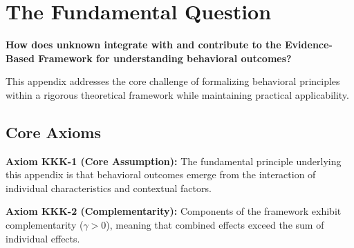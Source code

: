 

\section{The Fundamental Question}
\label{sec:kkk-fundamental}

\begin{tcolorbox}[
    colback=red!5!white,
    colframe=red!75!black,
    title={\textbf{Fundamental Question}}
]
\textbf{How does unknown integrate with and contribute to the
Evidence-Based Framework for understanding behavioral outcomes?}

This appendix addresses the core challenge of formalizing behavioral principles
within a rigorous theoretical framework while maintaining practical applicability.
\end{tcolorbox}




\subsection{Core Axioms}
\label{sec:kkk-axioms}

\begin{tcolorbox}[colback=yellow!5!white,colframe=yellow!75!black,title=Axiom KKK-1: Fundamental Principle]
\textbf{Axiom KKK-1 (Core Assumption):}
The fundamental principle underlying this appendix is that behavioral outcomes
emerge from the interaction of individual characteristics and contextual factors.
\end{tcolorbox}

\begin{tcolorbox}[colback=yellow!5!white,colframe=yellow!75!black,title=Axiom KKK-2: Complementarity]
\textbf{Axiom KKK-2 (Complementarity):}
Components of the framework exhibit complementarity ($\gamma > 0$), meaning
that combined effects exceed the sum of individual effects.
\end{tcolorbox}


